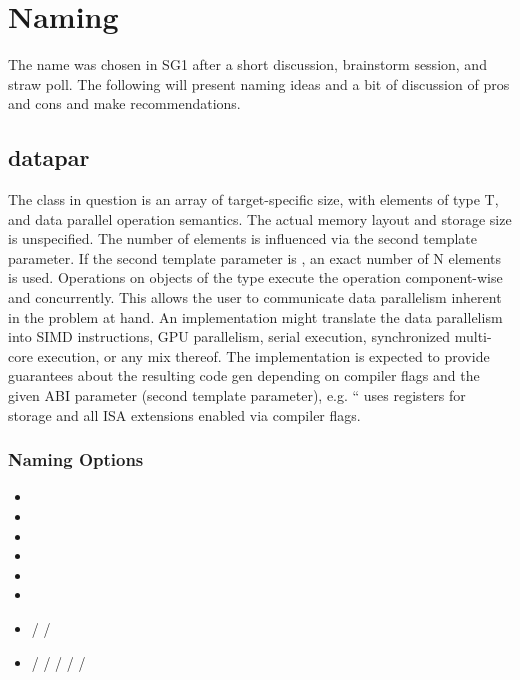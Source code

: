 \section{Naming}\label{sec:Naming}

The name \datapar was chosen in SG1 after a short discussion, brainstorm session, and straw poll.
The following will present naming ideas and a bit of discussion of pros and cons and make
recommendations.

\subsection{datapar}

The class in question is an array of target-specific size, with elements of type T, and data parallel operation semantics.
The actual memory layout and storage size is unspecified.
The number of elements is influenced via the second template parameter.
If the second template parameter is , an exact number of N elements is used.
Operations on objects of the type execute the operation component-wise and concurrently.
This allows the user to communicate data parallelism inherent in the problem at hand.
An implementation might translate the data parallelism into SIMD instructions, GPU parallelism, serial execution, synchronized multi-core execution, or any mix thereof.
The implementation is expected to provide guarantees about the resulting code gen depending on compiler flags and the given ABI parameter (second template parameter), e.g. “ uses  registers for storage and all ISA extensions enabled via compiler flags.

\subsubsection{Naming Options}

\begin{itemize}
  \item {}
  \item {}
  \item {}
  \item {}
  \item {}
  \item {}
  \item {} /  / 
  \item {} /  /  /  /  / 
\end{itemize}

